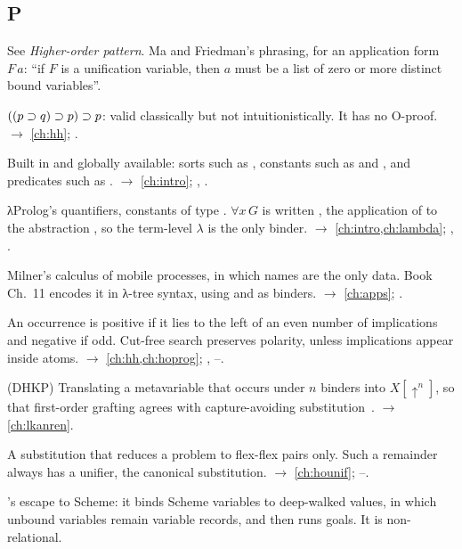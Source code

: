 \subsection*{P}
\begin{glossarylist}
\item[Pattern] See \emph{Higher-order pattern}. Ma and Friedman's phrasing, for an application form $F\,a$:
  \enquote{if $F$ is a unification variable, then $a$ must be a list of zero or more distinct bound variables}.
\item[Peirce's formula] $((p\supset q)\supset p)\supset p$: valid classically but not intuitionistically. It has no
  O-proof. $\rightarrow$ \cref{ch:hh}; .
\item[Pervasive] Built in and globally available: sorts such as , constants such as  and \lp{::},
  and predicates such as . $\rightarrow$ \cref{ch:intro}; , .
\item[\texttt{pi}, \texttt{sigma}] λProlog's quantifiers, constants of type . $\forall x\,G$
  is written , the application of  to the abstraction , so the term-level $\lambda$
  is the only binder. $\rightarrow$ \cref{ch:intro,ch:lambda}; , .
\item[$\pi$-calculus] Milner's calculus of mobile processes, in which names are the only data. Book Ch.~11 encodes
  it in λ-tree syntax, using  and  as binders. $\rightarrow$ \cref{ch:apps}; .
\item[Polarity, positive and negative occurrence] An occurrence is positive if it lies to the left of an even
  number of implications and negative if odd. Cut-free search preserves polarity, unless implications appear
  inside atoms. $\rightarrow$ \cref{ch:hh,ch:hoprog}; , --.
\item[Pre-cooking] (DHKP) Translating a metavariable that occurs under $n$ binders into $X[\uparrow^n]$, so that
  first-order grafting agrees with capture-avoiding substitution~\cite{DowekHardinKirchnerPfenning1996}.
  $\rightarrow$ \cref{ch:lkanren}.
\item[Pre-unifier] A substitution that reduces a problem to flex-flex pairs only. Such a remainder always has a
  unifier, the canonical substitution. $\rightarrow$ \cref{ch:hounif}; --.
\item[\texttt{project°}] \micro{}'s escape to Scheme: it binds Scheme variables to deep-walked values, in which
  unbound variables remain variable records, and then runs goals. It is non-relational.

\end{glossarylist}
